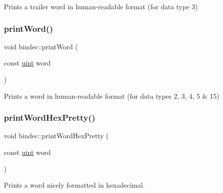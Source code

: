Prints a trailer word in human-\/readable format (for data type 3) 

\mbox{\label{namespacebindec_ac6d286aca6c2fa2fa29938e4d8247cfa}} 
\subsubsection{\texorpdfstring{print\+Word()}{printWord()}}
{\footnotesize\ttfamily void bindec\+::print\+Word (\begin{DoxyParamCaption}\item[{const \hyperlink{namespacebindec_a61700e6ffcfc677215bfdf223803e735}{uint}}]{word }\end{DoxyParamCaption})\hspace{0.3cm}{\ttfamily [inline]}}



Prints a word in human-\/readable format (for data types 2, 3, 4, 5 \& 15) 

\mbox{\label{namespacebindec_afaac14016b1f153ac47aec62509d14db}} 
\subsubsection{\texorpdfstring{print\+Word\+Hex\+Pretty()}{printWordHexPretty()}}
{\footnotesize\ttfamily void bindec\+::print\+Word\+Hex\+Pretty (\begin{DoxyParamCaption}\item[{const \hyperlink{namespacebindec_a61700e6ffcfc677215bfdf223803e735}{uint}}]{word }\end{DoxyParamCaption})\hspace{0.3cm}{\ttfamily [inline]}}



Prints a word nicely formatted in hexadecimal. 

